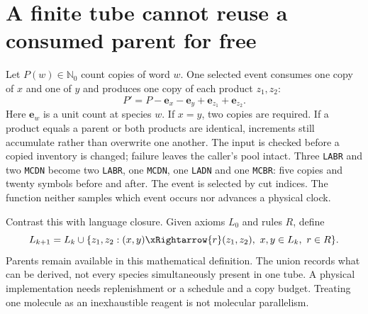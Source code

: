 \section{A finite tube cannot reuse a consumed parent for free}
Let $P(w)\in\mathbb N_0$ count copies of word $w$. One selected event consumes
one copy of $x$ and one of $y$ and produces one copy of each product $z_1,z_2$:
\begin{equation}
 P'=P-\mathbf e_x-\mathbf e_y+\mathbf e_{z_1}+\mathbf e_{z_2}.
 \label{eq:inventory}
\end{equation}
Here $\mathbf e_w$ is a unit count at species $w$. If $x=y$, two copies are
required. If a product equals a parent or both products are identical,
increments still accumulate rather than overwrite one another.
The input is checked before a copied inventory is changed; failure leaves the
caller's pool intact. Three \texttt{LABR} and two \texttt{MCDN} become two
\texttt{LABR}, one \texttt{MCDN}, one \texttt{LADN} and one \texttt{MCBR}:
five copies and twenty symbols before and after.
The event is selected by cut indices. The function neither samples which
event occurs nor advances a physical clock.

Contrast this with language closure. Given axioms $L_0$ and rules $R$, define
\begin{equation}
 L_{k+1}=L_k\cup
 \{z_1,z_2:(x,y)\xRightarrow{r}(z_1,z_2),\ x,y\in L_k,\ r\in R\}.
 \label{eq:closure}
\end{equation}
Parents remain available in this mathematical definition. The union records
what can be derived, not every species simultaneously present in one tube.
A physical implementation needs replenishment or a schedule and a copy budget.
Treating one molecule as an inexhaustible reagent is not molecular parallelism.

